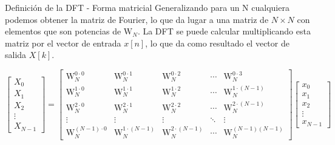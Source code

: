 \documentclass[aspectratio=169]{beamer}
\begin{document}
\begin{frame}{Definición de la DFT - Forma matricial}
Generalizando para un N cualquiera podemos obtener la matriz de Fourier, lo que da lugar a una matriz de $N \times N$ con elementos que son potencias de $\text{W}_N$. La DFT se puede calcular multiplicando esta matriz por el vector de entrada $x[n]$, lo que da como resultado el vector de salida $X[k]$.
    
\begin{equation}
\label{eq:dft-matrixC}
\begin{bmatrix}
X_0 \\
X_1 \\
X_2 \\
\vdots \\
X_{N-1}
\end{bmatrix}
=
\begin{bmatrix}
\text{W}_N^{0\cdot0} & \text{W}_N^{0\cdot1} & \text{W}_N^{0\cdot2} & \cdots & \text{W}_N^{0\cdot3} \\
\text{W}_N^{1\cdot0} & \text{W}_N^{1\cdot1} & \text{W}_N^{1\cdot2} & \cdots & \text{W}_N^{1\cdot(N-1)} \\
\text{W}_N^{2\cdot0} & \text{W}_N^{2\cdot1} & \text{W}_N^{2\cdot2} & \cdots & \text{W}_N^{2\cdot(N-1)} \\
\vdots & \vdots & \vdots & \ddots & \vdots \\
\text{W}_N^{(N-1) \cdot 0} & \text{W}_N^{1\cdot(N-1)} & \text{W}_N^{2\cdot(N-1)} & \cdots & \text{W}_N^{(N-1)(N-1)}
\end{bmatrix}
\begin{bmatrix}
x_0 \\
x_1 \\
x_2 \\
\vdots \\
x_{N-1}
\end{bmatrix}
\end{equation}
\end{frame}
\end{document}
